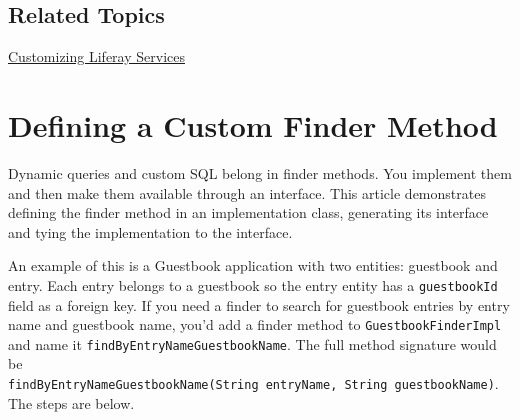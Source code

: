 \section{Related Topics}\label{related-topics-23}

\href{/docs/7-2/customization/-/knowledge_base/c/overriding-service-builder-services-service-wrappers}{Customizing
Liferay Services}

\chapter{Defining a Custom Finder
Method}\label{defining-a-custom-finder-method}

Dynamic queries and custom SQL belong in finder methods. You implement
them and then make them available through an interface. This article
demonstrates defining the finder method in an implementation class,
generating its interface and tying the implementation to the interface.

An example of this is a Guestbook application with two entities:
guestbook and entry. Each entry belongs to a guestbook so the entry
entity has a \texttt{guestbookId} field as a foreign key. If you need a
finder to search for guestbook entries by entry name and guestbook name,
you'd add a finder method to \texttt{GuestbookFinderImpl} and name it
\texttt{findByEntryNameGuestbookName}. The full method signature would
be
\texttt{findByEntryNameGuestbookName(String\ entryName,\ String\ guestbookName)}.
The steps are below.

